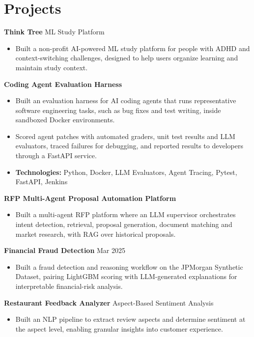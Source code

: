 \documentclass[10pt,a4paper]{article}
\begin{document}
\section{Projects}
\textbf{Think Tree} \textbar{} ML Study Platform\par
\begin{itemize}
  \item Built a non-profit AI-powered ML study platform for people with ADHD and context-switching challenges, designed to help users organize learning and maintain study context.
\end{itemize}
\textbf{Coding Agent Evaluation Harness}\par
\begin{itemize}
  \item Built an evaluation harness for AI coding agents that runs representative software engineering tasks, such as bug fixes and test writing, inside sandboxed Docker environments.
  \item Scored agent patches with automated graders, unit test results and LLM evaluators, traced failures for debugging, and reported results to developers through a FastAPI service.
  \item \textbf{Technologies:} Python, Docker, LLM Evaluators, Agent Tracing, Pytest, FastAPI, Jenkins
\end{itemize}
\textbf{RFP Multi-Agent Proposal Automation Platform}\par
\begin{itemize}
  \item Built a multi-agent RFP platform where an LLM supervisor orchestrates intent detection, retrieval, proposal generation, document matching and market research, with RAG over historical proposals.
\end{itemize}
\textbf{Financial Fraud Detection} \textbar{} Mar 2025\par
\begin{itemize}
  \item Built a fraud detection and reasoning workflow on the JPMorgan Synthetic Dataset, pairing LightGBM scoring with LLM-generated explanations for interpretable financial-risk analysis.
\end{itemize}
\textbf{Restaurant Feedback Analyzer} \textbar{} Aspect-Based Sentiment Analysis\par
\begin{itemize}
  \item Built an NLP pipeline to extract review aspects and determine sentiment at the aspect level, enabling granular insights into customer experience.
\end{itemize}
\end{document}
